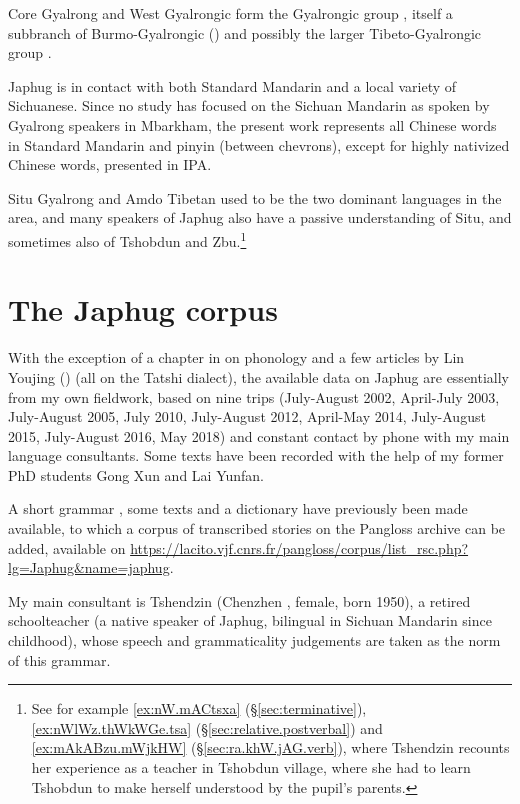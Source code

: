 Core Gyalrong and West Gyalrongic form the Gyalrongic group \citep{jackson00puxi}, itself a subbranch of Burmo-Gyalrongic (\citealt{jacques.michaud11naish}) and possibly  the larger Tibeto-Gyalrongic group \citep{Sagart19ST}.

Japhug is in contact with both Standard Mandarin and a local variety of Sichuanese. Since no study has focused on the Sichuan Mandarin as spoken by Gyalrong speakers in Mbarkham, the present work represents all Chinese words in Standard Mandarin and pinyin (between chevrons), except for highly nativized Chinese words, presented in IPA.

Situ Gyalrong and Amdo Tibetan used to be the two dominant languages in the area, and many speakers of Japhug also have a passive understanding of Situ, and sometimes also of Tshobdun and Zbu.\footnote{See for example \ref{ex:nW.mACtsxa} (§\ref{sec:terminative}), \ref{ex:nWlWz.thWkWGe.tsa} (§\ref{sec:relative.postverbal}) and \ref{ex:mAkABzu.mWjkHW} (§\ref{sec:ra.khW.jAG.verb}), where Tshendzin recounts her experience as a teacher in Tshobdun village, where she had to learn Tshobdun to make herself understood by the pupil's parents. }


 
 \section{The Japhug corpus}
With the exception of a chapter in \citet[468--486]{linxr93jiarong} on phonology and a few articles by Lin Youjing (\citealt{linluo03, lin11direction}) (all on the Tatshi dialect), the available data on Japhug
are essentially from my own fieldwork, based on nine trips (July-August 2002, April-July 2003, July-August 2005, July 2010, July-August 2012, April-May 2014, July-August 2015, July-August 2016, May 2018) and constant contact by phone with my main language consultants. Some texts have been recorded with the help of my former PhD students Gong Xun and Lai Yunfan.
 
A short grammar \citep{jacques08}, some texts \citep{jacques10gesar} and a dictionary \citep{jacques15japhug} have previously been made available, to which a corpus of transcribed stories on the  Pangloss archive \citep{michailovsky14pangloss} can be added, available on \url{https://lacito.vjf.cnrs.fr/pangloss/corpus/list_rsc.php?lg=Japhug&name=japhug}.


My main consultant is Tshendzin (Chenzhen , female, born 1950), a retired schoolteacher (a native speaker of Japhug, bilingual in Sichuan Mandarin since childhood), whose speech and grammaticality judgements are taken as the norm of this grammar. 

